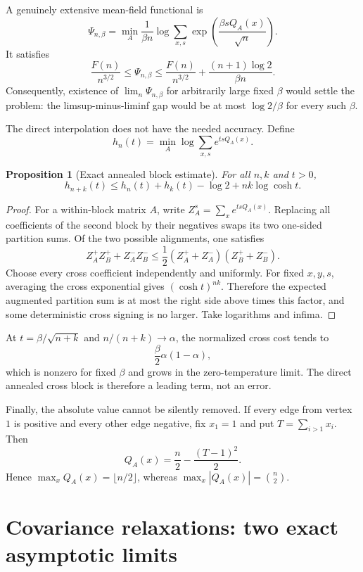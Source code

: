 \documentclass[11pt]{article}
\newtheorem{proposition}[theorem]{Proposition}
\begin{document}
A genuinely extensive mean-field functional is
\[
 \Psi_{n,\beta}=\min_A\frac1{\beta n}
 \log\sum_{x,s}\exp\left(\frac{\beta sQ_A(x)}{\sqrt n}\right).
\]
It satisfies
\begin{equation}
 \frac{F(n)}{n^{3/2}}
 \le\Psi_{n,\beta}
 \le\frac{F(n)}{n^{3/2}}+\frac{(n+1)\log2}{\beta n}.
 \label{eq:extensivesandwich}
\end{equation}
Consequently, existence of \(\lim_n\Psi_{n,\beta}\) for arbitrarily large
fixed \(\beta\) would settle the problem: the limsup-minus-liminf gap would
be at most \(\log2/\beta\) for every such \(\beta\).

The direct interpolation does not have the needed accuracy.  Define
\[
 h_n(t)=\min_A\log\sum_{x,s}e^{tsQ_A(x)}.
\]

\begin{proposition}[Exact annealed block estimate]
\label{prop:blocktemp}
For all \(n,k\) and \(t>0\),
\[
 h_{n+k}(t)\le h_n(t)+h_k(t)-\log2+nk\log\cosh t.
\]
\end{proposition}

\begin{proof}
For a within-block matrix \(A\), write
\(Z_A^s=\sum_xe^{tsQ_A(x)}\).  Replacing all coefficients of the second
block by their negatives swaps its two one-sided partition sums.  Of the two
possible alignments, one satisfies
\[
 Z_A^+Z_B^+ + Z_A^-Z_B^-
 \le\frac12(Z_A^++Z_A^-)(Z_B^++Z_B^-).
\]
Choose every cross coefficient independently and uniformly.  For fixed
\(x,y,s\), averaging the cross exponential gives \((\cosh t)^{nk}\).
Therefore the expected augmented partition sum is at most the right side
above times this factor, and some deterministic cross signing is no larger.
Take logarithms and infima.
\end{proof}

At \(t=\beta/\sqrt{n+k}\) and \(n/(n+k)\to\alpha\), the normalized cross cost
tends to
\[
 \frac\beta2\alpha(1-\alpha),
\]
which is nonzero for fixed \(\beta\) and grows in the zero-temperature limit.
The direct annealed cross block is therefore a leading term, not an error.

Finally, the absolute value cannot be silently removed.  If every edge from
vertex \(1\) is positive and every other edge negative, fix \(x_1=1\) and put
\(T=\sum_{i>1}x_i\).  Then
\[
 Q_A(x)=\frac n2-\frac{(T-1)^2}{2}.
\]
Hence \(\max_xQ_A(x)=\lfloor n/2\rfloor\), whereas
\(\max_x|Q_A(x)|=\binom n2\).

\section{Covariance relaxations: two exact asymptotic limits}
\end{document}
